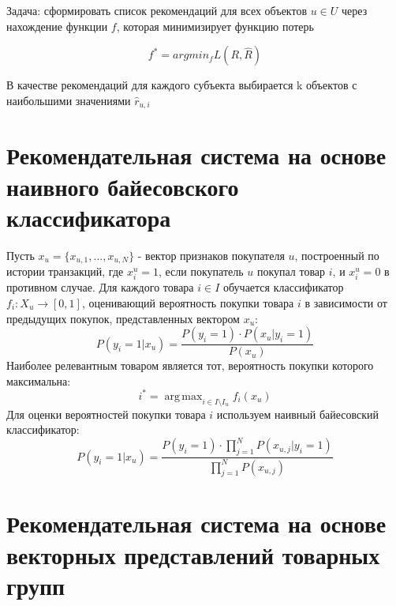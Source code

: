 \documentclass{article}
\DeclareMathOperator*{\argmax}{arg\,max}
\begin{document}
Задача: сформировать список рекомендаций для всех объектов $u \in U$ через нахождение функции $f$, которая минимизирует функцию потерь

\begin{equation}
\label{eq:foo}
f^* = argmin_f  L(R, \hat R)
\end{equation}

В качестве рекомендаций для каждого субъекта выбирается k объектов с наибольшими значениями $\hat r_{u,i}$


\section{Рекомендательная система на основе наивного байесовского классификатора}
Пусть $x_{u} = \{x_{u,1}, ..., x_{u,N}\}$ - вектор признаков покупателя $u$, построенный по истории транзакций, где $x^{u}_{i} = 1$, если покупатель $u$ покупал товар $i$, и $x^{u}_{i} = 0$ в противном случае.
Для каждого товара $i \in I$ обучается классификатор $f_i: X_u \rightarrow [0, 1]$, оценивающий вероятность покупки товара $i$ в зависимости от предыдущих покупок, представленных вектором $x_u$:
\begin{equation}
P(y_i = 1 | x_u) = \frac{P(y_i = 1) \cdot P(x_u | y_i = 1)}{P(x_u)}
\end{equation}
Наиболее релевантным товаром является тот, вероятность покупки которого максимальна:
\begin{equation}
i^* = \argmax_{i \in I \setminus I_u} f_i(x_u)
\end{equation}
Для оценки вероятностей покупки товара $i$ используем наивный байесовский классификатор:
\begin{equation}
P(y_i = 1 | x_u) = \frac{P(y_i = 1) \cdot \prod_{j=1}^N P(x_{u, j} | y_i = 1)}{\prod_{j=1}^N P(x_{u, j})}
\end{equation}

\section{Рекомендательная система на основе векторных представлений товарных групп}
\newcommand{\tfidf}{\ensuremath{\textit{TF-IDF}}}
\end{document}
